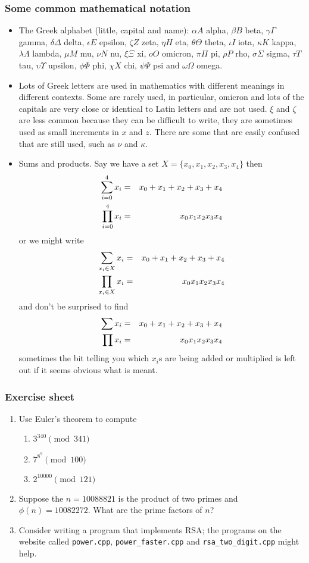\documentclass[12pt]{article}
\begin{document}
\subsubsection*{Some common mathematical notation}
\begin{itemize}
\item The Greek alphabet (little, capital and name): $\alpha A$ alpha, $\beta B$ beta, $\gamma \Gamma$ gamma, $\delta \Delta$ delta, $\epsilon E$ epsilon, $\zeta Z$ zeta, $\eta H$ eta, $\theta \Theta$ theta, $\iota I$ iota, $\kappa K$ kappa, $\lambda \Lambda$ lambda, $\mu M$ mu, $\nu N$ nu, $\xi \Xi$ xi, $oO$ omicron, $\pi \Pi$ pi, $\rho P$ rho, $\sigma \Sigma$ sigma, $\tau T$ tau, $\upsilon \Upsilon$ upsilon, $\phi \Phi$ phi, $\chi X$ chi, $\psi \Psi$ psi and $\omega \Omega$ omega. 
\item Lots of Greek letters are used in mathematics with different meanings in different contexts. Some are rarely used, in particular, omicron and lots of the capitals are very close or identical to Latin letters and are not used. $\xi$ and $\zeta$ are less common because they can be difficult to write, they are sometimes used as small increments in $x$ and $z$. There are some that are easily confused that are still used, such as $\nu$ and $\kappa$. 
\item Sums and products. Say we have a set $X=\{x_0,x_1,x_2,x_3,x_4\}$ then
\begin{eqnarray}
\sum_{i=0}^4x_i&=&x_0+x_1+x_2+x_3+x_4\cr
\prod_{i=0}^4x_i&=&x_0x_1x_2x_3x_4
\end{eqnarray}
or we might write
\begin{eqnarray}
\sum_{x_i\in X}x_i&=&x_0+x_1+x_2+x_3+x_4\cr
\prod_{x_i\in X}x_i&=&x_0x_1x_2x_3x_4
\end{eqnarray}
and don't be surprised to find
\begin{eqnarray}
\sum x_i&=&x_0+x_1+x_2+x_3+x_4\cr
\prod x_i&=&x_0x_1x_2x_3x_4
\end{eqnarray} 
sometimes the bit telling you which $x_i$s are being added or multiplied is left out if it seems obvious what is meant.
\end{itemize}


\subsubsection*{Exercise sheet}

\begin{enumerate}
\item Use Euler's theorem to compute
\begin{enumerate}
\item $3^{340}\pmod{341}$
\item $7^{8^9}\pmod{100}$
\item $2^{10000}\pmod{121}$
\end{enumerate}
\item Suppose the $n=10088821$ is the product of two primes and $\phi(n)=10082272$. What are the prime factors of $n$?
\item Consider writing a program that implements RSA; the programs on the website called \texttt{power.cpp}, \texttt{power\_faster.cpp} and \texttt{rsa\_two\_digit.cpp} might help.
\end{enumerate}
\end{document}
